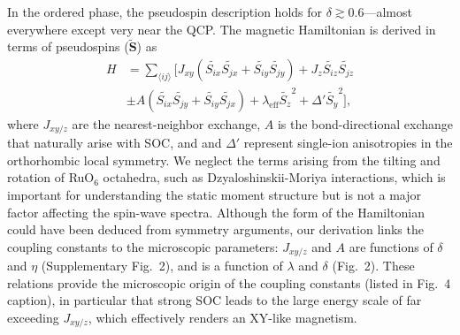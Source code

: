 In the ordered phase, the pseudospin description holds for $\delta\gtrsim0.6$---almost everywhere except very near the QCP. The magnetic Hamiltonian is derived in terms of pseudospins ($\tilde{\mathbf{S}}$) as
\begin{align*}
H &= \sum_{\langle ij\rangle } 
[J_{xy} (\tilde{S_{ix}} \tilde{S_{jx}}+\tilde{S_{iy}} \tilde{S_{jy}}) + J_z \tilde{S_{iz}} \tilde{S_{jz}} \\
&\pm A (\tilde{S_{ix}} \tilde{S_{jy}}+\tilde{S_{iy}} \tilde{S_{jx}}) + \lambda_{\mathrm{eff}} \tilde{S_z}^2 +\Delta' \tilde{S_y}^2],
\end{align*}
\noindent
where $J_{xy/z}$ are the nearest-neighbor exchange, $A$ is the bond-directional exchange that naturally arise with SOC, and \leff and $\Delta'$ represent single-ion anisotropies in the orthorhombic local symmetry. We neglect the terms arising from the tilting and rotation of RuO$_6$ octahedra, such as Dzyaloshinskii-Moriya interactions, which is important for understanding the static moment structure but is not a major factor affecting the spin-wave spectra.  Although the form of the Hamiltonian could have been deduced from symmetry arguments, our derivation %
links the coupling constants to the microscopic parameters: $J_{xy/z}$ and $A$ are functions of $\delta$ and $\eta$ (Supplementary Fig.~2), and \leff is a function of $\lambda$ and $\delta$ (Fig.~2). These relations provide the microscopic origin of the coupling constants (listed in Fig.~4 caption), in particular that strong SOC leads to the large energy scale of \leff far exceeding $J_{xy/z}$, which effectively renders an XY-like magnetism.
  
  
  
